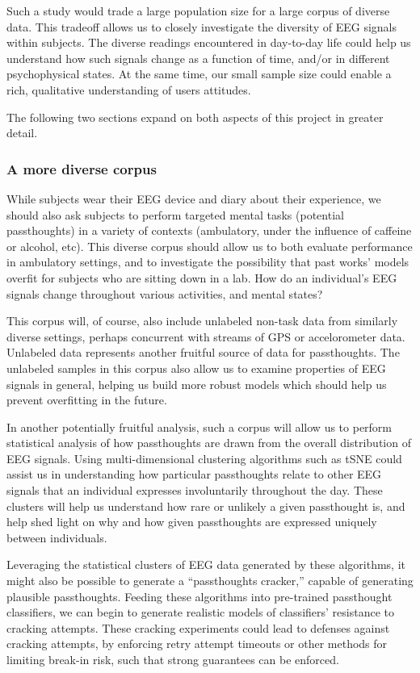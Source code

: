 \documentclass[sigconf]{acmart}
\begin{document}
Such a study would trade a large population size for a large corpus of diverse data.
This tradeoff allows us to closely investigate the diversity of EEG signals within subjects.
The diverse readings encountered in day-to-day life could help us understand how such signals change as a function of time, and/or in different psychophysical states.
At the same time, our small sample size could enable a rich, qualitative understanding of users attitudes.

The following two sections expand on both aspects of this project in greater detail.

\subsubsection{A more diverse corpus}
\label{sec:orgb90c729}

While subjects wear their EEG device and diary about their experience, we should also ask subjects to perform
targeted mental tasks (potential passthoughts) in a variety of contexts (ambulatory, under the influence of caffeine or alcohol, etc). 
This diverse corpus should allow us to both evaluate performance in ambulatory settings, and to
investigate the possibility that past works' models overfit for subjects who are sitting down in a lab.
How do an individual's EEG signals change throughout various activities, and mental states?

This corpus will, of course, also include unlabeled non-task data from similarly diverse settings, perhaps concurrent with streams of GPS or accelorometer data.
Unlabeled data represents another fruitful source of data for passthoughts.
The unlabeled samples in this corpus also allow us to examine properties of EEG signals in general, helping us build more robust models which should help us prevent overfitting in the future.

In another potentially fruitful analysis, such a corpus will allow us to perform statistical analysis of how passthoughts are drawn from the overall distribution of EEG signals. 
Using multi-dimensional clustering algorithms such as tSNE \cite{VanDerMaaten2008} 
could assist us in understanding how particular passthoughts relate to other EEG signals that an individual expresses involuntarily throughout the day. 
These clusters will help us understand how rare or unlikely a given passthought is, and help shed light on why and how given passthoughts are expressed uniquely between individuals.

Leveraging the statistical clusters of EEG data generated by these algorithms, it might also be possible to generate a ``passthoughts cracker,'' capable of generating plausible passthoughts. 
Feeding these algorithms into pre-trained passthought classifiers, we can begin to generate realistic models of classifiers' resistance to cracking attempts. 
These cracking experiments could lead to defenses against cracking attempts, by enforcing retry attempt timeouts or other methods for limiting break-in risk, such that strong guarantees can be enforced.
\end{document}
